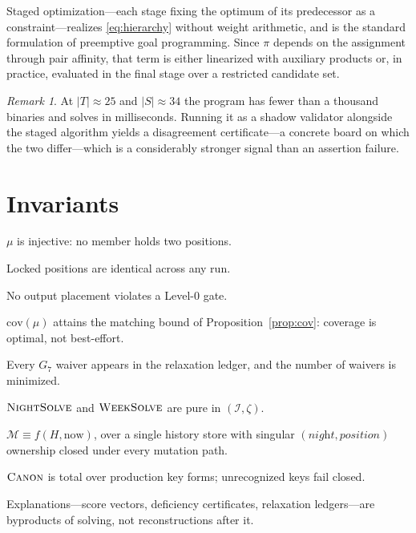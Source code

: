 \documentclass[11pt,a4paper]{article}
\theoremstyle{definition}
\theoremstyle{remark}
\newtheorem{remark}{Remark}
\newcommand{\nightsolve}{\textsc{NightSolve}}
\newcommand{\weeksolve}{\textsc{WeekSolve}}
\newcommand{\canon}{\textsc{Canon}}
\begin{document}
Staged optimization---each stage fixing the optimum of its predecessor as a
constraint---realizes \eqref{eq:hierarchy} without weight arithmetic, and is
the standard formulation of preemptive goal programming. Since $\pi$ depends
on the assignment through pair affinity, that term is either linearized with
auxiliary products or, in practice, evaluated in the final stage over a
restricted candidate set.

\begin{remark}
At $\lvert T \rvert \approx 25$ and $\lvert S \rvert \approx 34$ the
program has fewer than a thousand binaries and solves in milliseconds.
Running it as a shadow validator alongside the staged algorithm yields a
disagreement certificate---a concrete board on which the two differ---which
is a considerably stronger signal than an assertion failure.
\end{remark}

\section{Invariants}
\label{sec:invariants}

\begin{description}[itemsep=0.15em,topsep=0.3em,leftmargin=3.4em,
                    font=\normalfont\bfseries]
  \item[I1] $\mu$ is injective: no member holds two positions.
  \item[I2] Locked positions are identical across any run.
  \item[I3] No output placement violates a Level-0 gate.
  \item[I4] $\mathrm{cov}(\mu)$ attains the matching bound of
            Proposition~\ref{prop:cov}: coverage is optimal, not
            best-effort.
  \item[I5] Every $G_7$ waiver appears in the relaxation ledger, and the
            number of waivers is minimized.
  \item[I6] $\nightsolve$ and $\weeksolve$ are pure in
            $(\mathcal{I}, \zeta)$.
  \item[I7] $\mathcal{M} \equiv f(H, \mathrm{now})$, over a single history
            store with singular $(\textit{night}, \textit{position})$
            ownership closed under every mutation path.
  \item[I8] $\canon$ is total over production key forms; unrecognized keys
            fail closed.
  \item[I9] Explanations---score vectors, deficiency certificates,
            relaxation ledgers---are byproducts of solving, not
            reconstructions after it.
\end{description}
\end{document}
